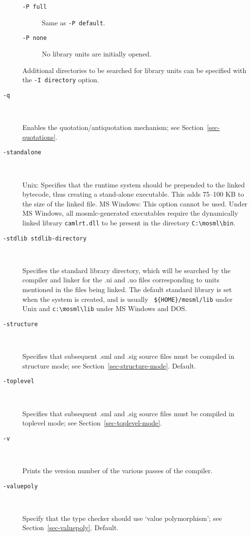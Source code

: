 \documentclass[fleqn,a4paper]{article}
\begin{document}
\begin{description}
\begin{description}
  \item[{\tt -P full}] Same as {\tt -P default}.

  \item[{\tt -P none}] No library units are initially opened.
  \end{description}
  
  Additional directories to be searched for library units can be
  specified with the {\tt -I {\rm directory}} option.

\item[{\tt -q}]\mbox{ }

  Enables the quotation/antiquotation mechanism; see
  Section~\ref{sec-quotations}.

\item[{\tt -standalone}]\mbox{ }
  
  Unix: Specifies that the runtime system should be prepended to the
  linked bytecode, thus creating a stand-alone executable.  This adds
  75--100 KB to the size of the linked file.  MS Windows: This option
  cannot be used.  Under MS Windows, all mosmlc-generated executables
  require the dynamically linked library \texttt{camlrt.dll} to be
  present in the directory \verb+C:\mosml\bin+.

\item[{\tt -stdlib {\rm stdlib-directory}}]\mbox{ }

  Specifies the standard library directory, which will be searched by
  the compiler and linker for the .ui and .uo files corresponding to
  units mentioned in the files being linked.  The default standard
  library is set when the system is created, and is usually {\tt
    \$\{HOME\}/mosml/lib} under Unix and \verb#c:\mosml\lib# under MS
  Windows and DOS.

\item[{\tt -structure}]\mbox{ }
  
  Specifies that subsequent .sml and .sig source files must be
  compiled in structure mode; see Section~\ref{sec-structure-mode}.
  Default.

\item[{\tt -toplevel}]\mbox{ }
  
  Specifies that subsequent .sml and .sig source files must be
  compiled in toplevel mode; see Section~\ref{sec-toplevel-mode}.

\item[{\tt -v}]\mbox{ }
  
  Prints the version number of the various passes of the compiler.

\item[{\tt -valuepoly}]\mbox{ }

  Specify that the type checker should use `value polymorphism'; see
  Section~\ref{sec-valuepoly}.  Default.
\end{description}
\end{document}
